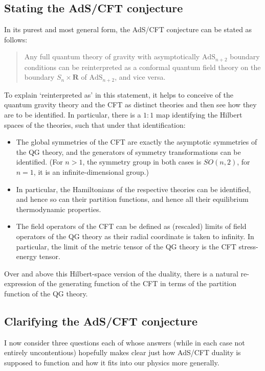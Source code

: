 \documentclass{article}
\newcommand{\re}{\ensuremath{\mathbf{R}}}
\newcommand{\AdS}{\mathrm{AdS}}
\begin{document}
\subsection{Stating the AdS/CFT conjecture}\label{ads-intro}

In its purest and most general form, the AdS/CFT conjecture can be stated as follows:
\begin{quote}
Any full quantum theory of gravity with asymptotically $\AdS_{n+2}$ boundary conditions can be reinterpreted as a conformal quantum field theory on the boundary $S_n\times \re$ of $\AdS_{n+2}$, and vice versa.
\end{quote}
To explain `reinterpreted as' in this statement, it helps to conceive of the quantum gravity theory and the CFT as distinct theories and then see how they are to be identified. In particular, there is a $1:1$ map identifying the Hilbert spaces of the theories, such that under that identification:
\begin{itemize}
\item The global symmetries of the CFT are exactly the asymptotic symmetries of the QG theory, and the generators of symmetry transformations can be identified. (For $n>1$, the symmetry group in both cases is $SO(n,2)$, for $n=1$, it is an infinite-dimensional group.)
\item In particular, the Hamiltonians of the respective theories can be identified, and hence so can their partition functions, and hence all their equilibrium thermodynamic properties.
\item The field operators of the CFT can be defined as (rescaled) limits of field operators of the QG theory as their radial coordinate is taken to infinity. In particular, the limit of the metric tensor of the QG theory is the CFT stress-energy tensor.
\end{itemize}
Over and above this Hilbert-space version of the duality, there is a natural re-expression of the generating function of the CFT  in terms of the partition function of the QG theory.

\subsection{Clarifying the AdS/CFT conjecture}

I now consider three questions each of whose answers (while in each case not entirely uncontentious) hopefully makes clear just how AdS/CFT duality is supposed to function and how it fits into our physics more generally.
\end{document}
